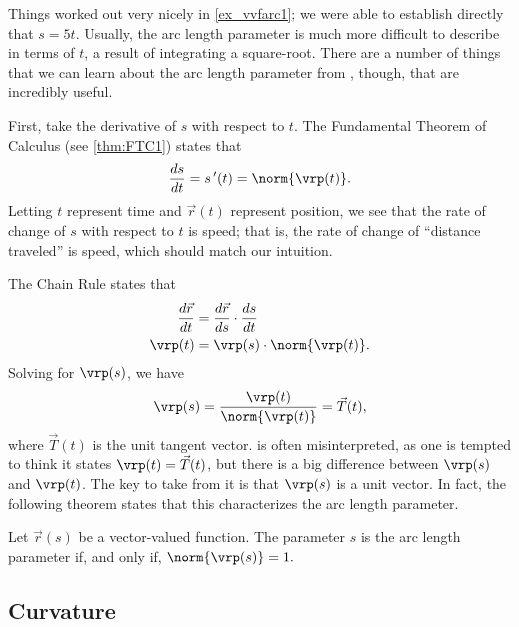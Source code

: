 Things worked out very nicely in \autoref{ex_vvfarc1}; we were able to establish directly that $s=5t$. Usually, the arc length parameter is much more difficult to describe in terms of $t$, a result of integrating a square-root. There are a number of things that we can learn about the arc length parameter from , though, that are incredibly useful.

First, %
take the derivative of $s$ with respect to $t$. The Fundamental Theorem of Calculus (see \autoref{thm:FTC1}) states that
\begin{equation}
\frac{ds}{dt}=s\,'(t) = \norm{\vrp(t)}.\label{eq:vvfarc3}
\end{equation}
Letting $t$ represent time and $\vec r(t)$ represent position, we see that the rate of change of $s$ with respect to $t$ is speed; that is, the rate of change of ``distance traveled'' is speed, which should match our intuition.

The Chain Rule states that 
\begin{align*}
\frac{d\vec r}{dt} &= \frac{d\vec r}{ds}\cdot\frac{ds}{dt}\\
\vrp(t) &= \vrp(s)\cdot \norm{\vrp(t)}.
\end{align*}
Solving for $\vrp(s)$, we have 
\begin{equation}
\vrp(s) = \frac{\vrp(t)}{\norm{\vrp(t)}} = \vec T(t),\label{eq:vvfarc2}
\end{equation}
where $\vec T(t)$ is the unit tangent vector.  is often misinterpreted, as one is tempted to think it states $\vrp(t) = \vec T(t)$, but there is a big difference between $\vrp(s)$ and $\vrp(t)$. The key to take from it is that $\vrp(s)$ is a unit vector. In fact, the following theorem states that this characterizes the arc length parameter.

\begin{theorem}\label{thm:arclengthparam}
Let $\vec r(s)$ be a vector-valued function. The parameter $s$ is the arc length parameter if, and only if, $\norm{\vrp(s)} = 1.$
\end{theorem}

\subsection{Curvature}

